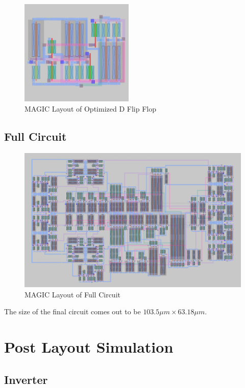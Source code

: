 \documentclass[conference]{IEEEtran}
\begin{document}
\begin{figure}[H]
    \centering
    \includegraphics[width=0.48\textwidth]{images/d_ff_optimized_layout.png}
    \caption{MAGIC Layout of Optimized D Flip Flop}
\end{figure}


\subsection{Full Circuit}

\begin{figure}[t]
    \centering
    \includegraphics[width=1\textwidth]{images/full_optimized_layout.png}
    \caption{MAGIC Layout of Full Circuit}
\end{figure}

The size of the final circuit comes out to be $103.5 \mu m \times 63.18 \mu m$.

\section{Post Layout Simulation}

\subsection{Inverter}
\end{document}
